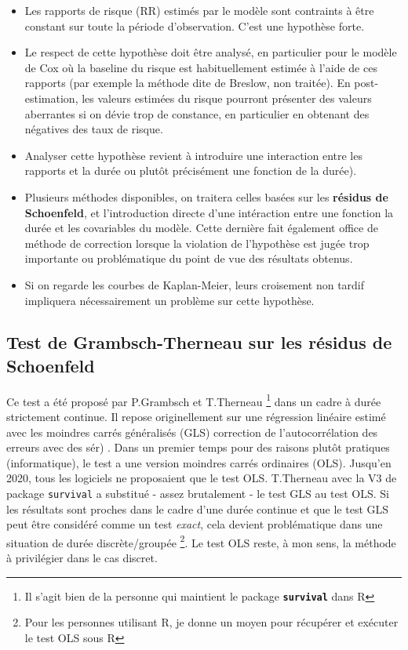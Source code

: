 \documentclass[
  12pt,
  letterpaper,
  DIV=11,
  numbers=noendperiod,
  onepage,
  openany]{scrreprt}
\begin{document}
\begin{itemize}
\item
  Les rapports de risque (RR) estimés par le modèle sont contraints à
  être constant sur toute la période d'observation. C'est une hypothèse
  forte.
\item
  Le respect de cette hypothèse doit être analysé, en particulier pour
  le modèle de Cox où la baseline du risque est habituellement estimée à
  l'aide de ces rapports (par exemple la méthode dite de Breslow, non
  traitée). En post-estimation, les valeurs estimées du risque pourront
  présenter des valeurs aberrantes si on dévie trop de constance, en
  particulier en obtenant des négatives des taux de risque.
\item
  Analyser cette hypothèse revient à introduire une interaction entre
  les rapports et la durée ou plutôt précisément une fonction de la
  durée).
\item
  Plusieurs méthodes disponibles, on traitera celles basées sur les
  \textbf{résidus de Schoenfeld}, et l'introduction directe d'une
  intéraction entre une fonction la durée et les covariables du modèle.
  Cette dernière fait également office de méthode de correction lorsque
  la violation de l'hypothèse est jugée trop importante ou problématique
  du point de vue des résultats obtenus.
\item
  Si on regarde les courbes de Kaplan-Meier, leurs croisement non tardif
  impliquera nécessairement un problème sur cette hypothèse.
\end{itemize}

\hypertarget{test-de-grambsch-therneau-sur-les-ruxe9sidus-de-schoenfeld}{%
\subsection{Test de Grambsch-Therneau sur les résidus de
Schoenfeld}\label{test-de-grambsch-therneau-sur-les-ruxe9sidus-de-schoenfeld}}

Ce test a été proposé par P.Grambsch et T.Therneau \footnote{Il s'agit
  bien de la personne qui maintient le package
  \textbf{\texttt{survival}} dans R} dans un cadre à durée strictement
continue. Il repose originellement sur une régression linéaire estimé
avec les moindres carrés généralisés (GLS) correction de
l'autocorrélation des erreurs avec des sér) . Dans un premier temps pour
des raisons plutôt pratiques (informatique), le test a une version
moindres carrés ordinaires (OLS). Jusqu'en 2020, tous les logiciels ne
proposaient que le test OLS. T.Therneau avec la V3 de package
\texttt{survival} a substitué - assez brutalement - le test GLS au test
OLS. Si les résultats sont proches dans le cadre d'une durée continue et
que le test GLS peut être considéré comme un test \emph{exact}, cela
devient problématique dans une situation de durée discrète/groupée
\footnote{Pour les personnes utilisant R, je donne un moyen pour
  récupérer et exécuter le test OLS sous R}. Le test OLS reste, à mon
sens, la méthode à privilégier dans le cas discret.
\end{document}
